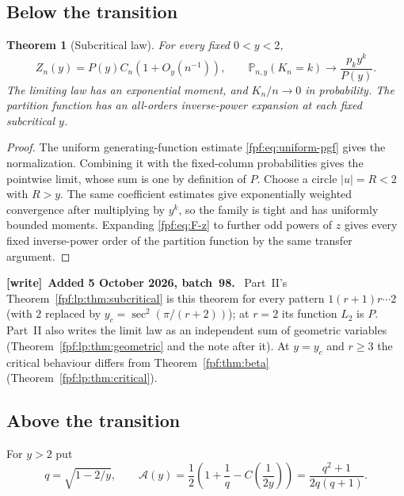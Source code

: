 \documentclass[11pt]{article}
\numberwithin{equation}{section}
\newtheorem{theorem}{Theorem}[section]
\theoremstyle{definition}
\newcommand{\Prob}{\mathbb P}
\newenvironment{writenote}[1][]{\par\smallskip\begingroup\small
 \noindent\textbf{[write]}\if\relax\detokenize{#1}\relax\else~\textbf{#1.}\fi\ }%
 {\par\endgroup\smallskip}
\begin{document}
\subsection{Below the transition}
\begin{theorem}[Subcritical law]\label{fpf:thm:subcritical}
For every fixed $0<y<2$,
\begin{equation}\label{fpf:eq:subcritical}
 Z_n(y)=P(y)C_n(1+O_y(n^{-1})),\qquad
 \Prob_{n,y}(K_n=k)\longrightarrow \frac{p_ky^k}{P(y)}.
\end{equation}
The limiting law has an exponential moment, and $K_n/n\to0$ in probability.
The partition function has an all-orders inverse-power expansion at each
fixed subcritical $y$.
\end{theorem}
\begin{proof}
The uniform generating-function estimate \eqref{fpf:eq:uniform-pgf} gives the
normalization. Combining it with the fixed-column probabilities gives the
pointwise limit, whose sum is one by definition of $P$. Choose a circle
$|u|=R<2$ with $R>y$. The same coefficient estimates give exponentially
weighted convergence after multiplying by $y^k$, so the family is tight
and has uniformly bounded moments. Expanding \eqref{fpf:eq:F-z} to further
odd powers of $z$ gives every fixed inverse-power order of the partition
function by the same transfer argument.
\end{proof}

\begin{writenote}[Added 5 October 2026, batch~98]
Part~II's Theorem~\ref{fpf:lp:thm:subcritical} is this theorem for every
pattern $1(r+1)r\cdots2$ (with $2$ replaced by
$y_c=\sec^2(\pi/(r+2))$); at $r=2$ its function $L_2$ is $P$. Part~II also
writes the limit law as an independent sum of geometric variables
(Theorem~\ref{fpf:lp:thm:geometric} and the note after it). At $y=y_c$ and
$r\ge3$ the critical behaviour differs from Theorem~\ref{fpf:thm:beta}
(Theorem~\ref{fpf:lp:thm:critical}).
\end{writenote}

\subsection{Above the transition}
For $y>2$ put
\begin{equation}\label{fpf:eq:super-amplitude}
 q=\sqrt{1-2/y},\qquad
 \mathcal A(y)=\frac12\left(1+\frac1q-C\!\left(\frac1{2y}\right)\right)
              =\frac{q^2+1}{2q(q+1)}.
\end{equation}
\end{document}
